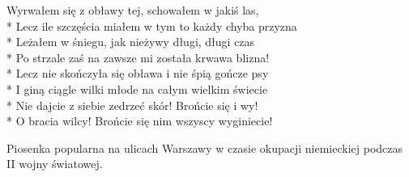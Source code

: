 \begin{lyrics}[longestline={Bo z trzema na raz walczy psami i trzech ran na raz krwawi.}]
\chorusref

Wyrwałem się z obławy tej, schowałem w jakiś las,\\*
Lecz ile szczęścia miałem w tym to każdy chyba przyzna\\*
Leżałem w śniegu, jak nieżywy długi, długi czas\\*
Po strzale zaś na zawsze mi została krwawa blizna!\\*
Lecz nie skończyła się obława i nie śpią gończe psy\\*
I giną ciągle wilki młode na całym wielkim świecie\\*
Nie dajcie z siebie zedrzeć skór! Brońcie się i wy!\\*
O bracia wilcy! Brońcie się nim wszyscy wyginiecie!

\chorusref
\end{lyrics}







\begin{info}Piosenka popularna na ulicach Warszawy w czasie okupacji niemieckiej podczas II wojny światowej.\end{info}

